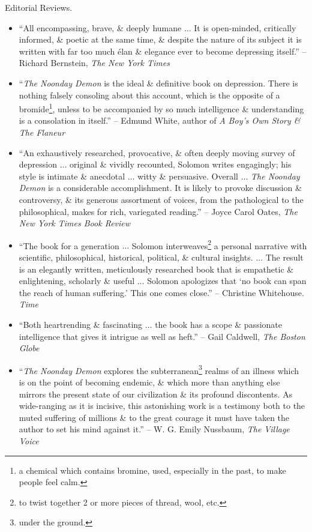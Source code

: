 \documentclass{article}
\begin{document}
\begin{enumerate}
	{\sf Editorial Reviews.}
	\begin{itemize}
		\item ``All encompassing, brave, \& deeply humane $\ldots$ It is open-minded, critically informed, \& poetic at the same time, \& despite the nature of its subject it is written with far too much \'elan \& elegance ever to become depressing itself.'' -- {\sc Richard Bernstein}, {\it The New York Times}
		\item ``{\it The Noonday Demon} is the ideal \& definitive book on depression. There is nothing falsely consoling about this account, which is the opposite of a bromide\footnote{a chemical which contains bromine, used, especially in the past, to make people feel calm.}, unless to be accompanied by so much intelligence \& understanding is a consolation in itself.'' -- {\sc Edmund White}, author of {\it A Boy's Own Story \& The Flaneur		}
		\item ``An exhaustively researched, provocative, \& often deeply moving survey of depression $\ldots$ original \& vividly recounted, {\sc Solomon} writes engagingly; his style is intimate \& anecdotal $\ldots$ witty \& persuasive. Overall $\ldots$ {\it The Noonday Demon} is a considerable accomplishment. It is likely to provoke discussion \& controversy, \& its generous assortment of voices, from the pathological to the philosophical, makes for rich, variegated reading.'' -- {\sc Joyce Carol Oates}, {\it The New York Times Book Review}
		\item ``The book for a generation $\ldots$ Solomon interweaves\footnote{to twist together 2 or more pieces of thread, wool, etc.} a personal narrative with scientific, philosophical, historical, political, \& cultural insights. $\ldots$ The result is an elegantly written, meticulously researched book that is empathetic \& enlightening, scholarly \& useful $\ldots$ Solomon apologizes that `no book can span the reach of human suffering.' This one comes close.'' -- {\sc Christine Whitehouse}. {\it Time}
		\item ``Both heartrending \& fascinating $\ldots$ the book has a scope \& passionate intelligence that gives it intrigue as well as heft.'' -- {\sc Gail Caldwell}, {\it The Boston Globe}
		\item ``{\it The Noonday Demon} explores the subterranean\footnote{under the ground.} realms of an illness which is on the point of becoming endemic, \& which more than anything else mirrors the present state of our civilization \& its profound discontents. As wide-ranging as it is incisive, this astonishing work is a testimony both to the muted suffering of millions \& to the great courage it must have taken the author to set his mind against it.'' -- {\sc W. G. Emily Nussbaum}, {\it The Village Voice}

\end{itemize}
\end{enumerate}
\end{document}

